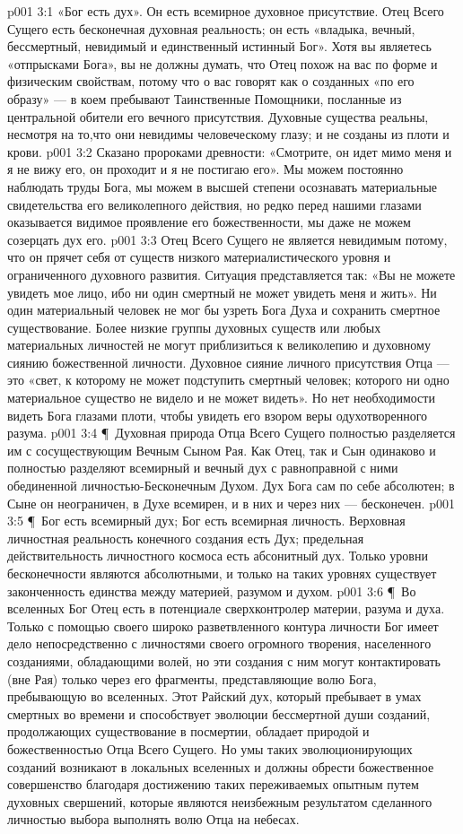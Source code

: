 \vs p001 3:1 «Бог есть дух». Он есть всемирное духовное присутствие. Отец Всего Сущего есть бесконечная духовная реальность; он есть «владыка, вечный, бессмертный, невидимый и единственный истинный Бог». Хотя вы являетесь «отпрысками Бога», вы не должны думать, что Отец похож на вас по форме и физическим свойствам, потому что о вас говорят как о созданных «по его образу» --- в коем пребывают Таинственные Помощники, посланные из центральной обители его вечного присутствия. Духовные существа реальны, несмотря на то,что они невидимы человеческому глазу; и не созданы из плоти и крови.
\vs p001 3:2 Сказано пророками древности: «Смотрите, он идет мимо меня и я не вижу его, он проходит и я не постигаю его». Мы можем постоянно наблюдать труды Бога, мы можем в высшей степени осознавать материальные свидетельства его великолепного действия, но редко перед нашими глазами оказывается видимое проявление его божественности, мы даже не можем созерцать дух его.
\vs p001 3:3 Отец Всего Сущего не является невидимым потому, что он прячет себя от существ низкого материалистического уровня и ограниченного духовного развития. Ситуация представляется так: «Вы не можете увидеть мое лицо, ибо ни один смертный не может увидеть меня и жить». Ни один материальный человек не мог бы узреть Бога Духа и сохранить смертное существование. Более низкие группы духовных существ или любых материальных личностей не могут приблизиться к великолепию и духовному сиянию божественной личности. Духовное сияние личного присутствия Отца --- это «свет, к которому не может подступить смертный человек; которого ни одно материальное существо не видело и не может видеть». Но нет необходимости видеть Бога глазами плоти, чтобы увидеть его взором веры одухотворенного разума.
\vs p001 3:4 \P\ Духовная природа Отца Всего Сущего полностью разделяется им с сосуществующим Вечным Сыном Рая. Как Отец, так и Сын одинаково и полностью разделяют всемирный и вечный дух с равноправной с ними обединенной личностью\hyp{}Бесконечным Духом. Дух Бога сам по себе абсолютен; в Сыне он неограничен, в Духе всемирен, и в них и через них --- бесконечен.
\vs p001 3:5 \P\ Бог есть всемирный дух; Бог есть всемирная личность. Верховная личностная реальность конечного создания есть Дух; предельная действительность личностного космоса есть абсонитный дух. Только уровни бесконечности являются абсолютными, и только на таких уровнях существует законченность единства между материей, разумом и духом.
\vs p001 3:6 \P\ Во вселенных Бог Отец есть в потенциале сверхконтролер материи, разума и духа. Только с помощью своего широко разветвленного контура личности Бог имеет дело непосредственно с личностями своего огромного творения, населенного созданиями, обладающими волей, но эти создания с ним могут контактировать (вне Рая) только через его фрагменты, представляющие волю Бога, пребывающую во вселенных. Этот Райский дух, который пребывает в умах смертных во времени и способствует эволюции бессмертной души созданий, продолжающих существование в посмертии, обладает природой и божественностью Отца Всего Сущего. Но умы таких эволюционирующих созданий возникают в локальных вселенных и должны обрести божественное совершенство благодаря достижению таких переживаемых опытным путем духовных свершений, которые являются неизбежным результатом сделанного личностью выбора выполнять волю Отца на небесах.
